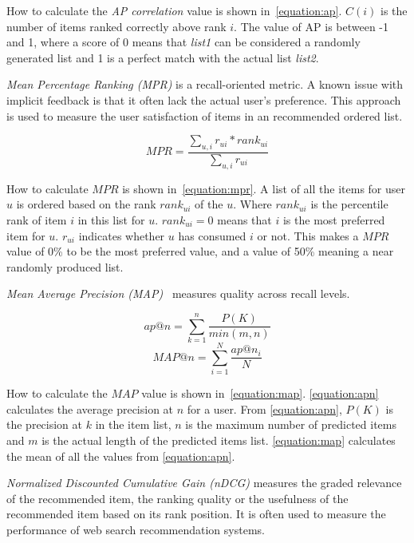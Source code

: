 How to calculate the \textit{AP correlation} value is shown in~\ref{equation:ap}.
$C(i)$ is the number of items ranked correctly above rank $i$.
The value of AP is between -1 and 1, where a score of 0 means that
\textit{list1} can be considered a randomly generated list and 1 is a perfect
match with the actual list \textit{list2}.


\textit{Mean Percentage Ranking (MPR)} is a recall-oriented metric.  A known
issue with implicit feedback is that it often lack the actual user's
preference.  This approach is used to measure the user satisfaction of items in
an recommended ordered list.

\begin{equation}
	MPR = \frac{\sum_{u,i}{r_{ui} * rank_{ui}}}{\sum_{u,i}{r_{ui}}}
	\label{equation:mpr}
\end{equation}

How to calculate $MPR$ is shown in~\ref{equation:mpr}.  A list of all the items
for user $u$ is ordered based on the rank $rank_{ui}$ of the $u$.  Where
$rank_{ui}$ is the percentile rank of item $i$ in this list for $u$.
$rank_{ui} = 0$ means that $i$ is the most preferred item for $u$.  $r_{ui}$
indicates whether $u$ has consumed $i$ or not.  This makes a $MPR$ value of
0\% to be the most preferred value, and a value of 50\% meaning a near
randomly produced list.

\textit{Mean Average Precision (MAP)}~\cite{Manning:2008:IIR:1394399} measures
quality across recall levels.

\begin{equation}
	ap@n = \sum_{k=1}^{n}{\frac{P(K)}{min(m,n)}}
	\label{equation:apn}
\end{equation}
\begin{equation}
	MAP@n = \sum_{i=1}^{N}{\frac{ap@n_i}{N}}
	\label{equation:map}
\end{equation}

How to calculate the $MAP$ value is shown in~\ref{equation:map}.
\ref{equation:apn} calculates the average precision at $n$ for a user.  From
\ref{equation:apn}, $P(K)$ is the precision at $k$ in the item list, $n$ is the
maximum number of predicted items and $m$ is the actual length of the predicted
items list.  \ref{equation:map} calculates the mean of all the values from
\ref{equation:apn}.

\textit{Normalized Discounted Cumulative Gain (nDCG)} measures the graded
relevance of the recommended item, the ranking quality or the usefulness of the
recommended item based on its rank position.  It is often used to measure the
performance of web search recommendation systems.

